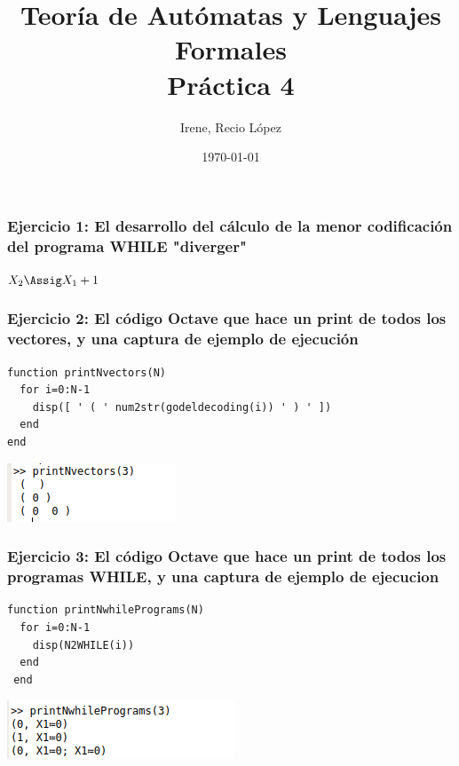\documentclass[fleqn, 10pt]{article}
\title{Teoría de Autómatas y Lenguajes Formales\\[.4\baselineskip]Práctica 4}
\author{Irene, Recio López}
\date{\today}
\theoremstyle{plain}
\theoremstyle{definition}
\begin{document}
\maketitle

\subsubsection*{Ejercicio 1: El desarrollo del cálculo de la menor codificación del programa WHILE "diverger"}

\begin{whilecode}[H]
	$X_2 \Assig X_1 + 1$\;
\end{whilecode}


\subsubsection*{Ejercicio 2: El código Octave que hace  un print de todos los vectores, y una captura de ejemplo de ejecución}

\begin{verbatim}
function printNvectors(N)
  for i=0:N-1
    disp([ ' ( ' num2str(godeldecoding(i)) ' ) ' ])
  end
end
\end{verbatim}

\centering	
	\includegraphics[scale=0.7]{P4ejercicio2}

\newpage
\subsubsection*{Ejercicio 3: El código Octave que hace un print de todos los programas WHILE, y una captura de ejemplo de ejecucion}


\begin{verbatim}
function printNwhilePrograms(N)
  for i=0:N-1
    disp(N2WHILE(i))
  end
 end
\end{verbatim}
\centering
	\includegraphics[scale=0.7]{P4ejercicio3}
\end{document}
